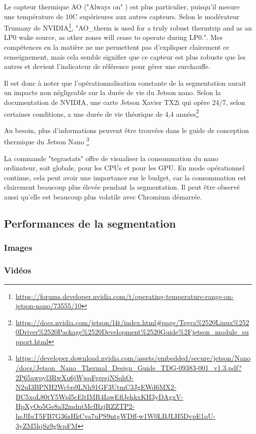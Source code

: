 \par Le capteur thermique AO ("Always on" ) est plus particulier, puisqu'il mesure une température de 10C supérieures aux autres capteurs. Selon le modérateur Trumany de NVIDIA\footnote{\url{https://forums.developer.nvidia.com/t/operating-temperature-range-on-jetson-nano/73555/10}}, "AO\_therm is used for a truly robust thermtrip and as an LP0 wake source, as other zones will cease to operate during LP0.". Mes compétences en la matière ne me permettent pas d'expliquer clairement ce renseignement, mais cela semble signifier que ce capteur est plus robuste que les autres et devient l'indicateur de référence pour gérer une surchauffe. 
\par Il est donc à noter que l'opérationnalisation constante de la segmentation aurait un impacte non négligeable sur la durée de vie du Jetson nano. Selon la documentation de NVIDIA, une carte Jetson Xavier TX2i qui opère 24/7, selon certaines conditions, a une durée de vie théorique de 4,4 années\footnote{\url{https://docs.nvidia.com/jetson/l4t/index.html\#page/Tegra\%2520Linux\%2520Driver\%2520Package\%2520Development\%2520Guide\%2Fjetson_module\_support.html}}
\par Au besoin, plus d'informations peuvent être trouvées dans le guide de conception thermique du Jetson Nano \footnote{\url{https://developer.download.nvidia.com/assets/embedded/secure/jetson/Nano/docs/Jetson\_Nano\_Thermal\_Design\_Guide\_TDG-09383-001_v1.3.pdf?2P65awpyl3RwXu6jWjsqFgresjNSqhO-N2uI3BPNH2Wcbp9LNh91GF3UtmC3JgEWd6MX2-BC5xoL80tY5Wpl5cEltIMR4IawEflJehkxKH3yDAgxV-HpXyOo5Ge8a32mdntMcfRzjRZZTP2-hsJlIuT5FB7G36zHkCva7uPS9ntgWDff-w1W0LBJLH5DvpE1qU-3yZM5hjSz9g9cpFM}}
\par La commande "tegrastats" offre de visualiser la consommation du nano ordinateur, soit globale, pour les CPUs et pour les GPU. En mode opérationnel continue, cela peut avoir une importance sur le budget, car la consommation est clairement beaucoup plus élevée pendant la segmentation. Il peut être observé aussi qu'elle est beaucoup plus volatile avec Chromium démarrée. 
\subsection{Performances de la segmentation}
\subsubsection{Images}
{\color{red}
}
\subsubsection{Vidéos}
{\color{red}
}